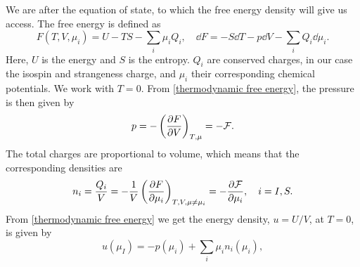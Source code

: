 We are after the equation of state, to which the free energy density will give us access.
The free energy is defined as
%
\begin{equation}
    \label{thermodynamic free energy}
    F(T, V, \mu_i) = U - TS - {\sum}_i \mu_i Q_i, 
    \quad \dd 
    F = - S \dd T - p \dd V - {\sum}_i Q_i \dd \mu_i.
\end{equation}
%
Here, $U$ is the energy and $S$ is the entropy.
$Q_i$ are conserved charges, in our case the isospin and strangeness charge, and $\mu_i$ their corresponding chemical potentials.
We work with $T = 0$.
From \autoref{thermodynamic free energy}, the pressure is then given by
%
\begin{equation}
    \label{pressure form free energy}
    p = - \left(\pdv{F}{V}\right)_{T, \mu} = - \mathcal{F}.
\end{equation}
%
The total charges are proportional to volume, which means that the corresponding densities are
%
\begin{equation}
    n_i = \frac{Q_i}{V} = - \frac{1}{V} \left(\pdv{F}{\mu_i}\right)_{T, V,\mu\neq\mu_i}
    = - \pdv{\mathcal{F}}{\mu_i}, \quad i = I, S.
\end{equation}
%
From \autoref{thermodynamic free energy} we get the energy density, $u = U/V$, at $T = 0$, is given by
%
\begin{equation}
    \label{energy density form pressure and isospin}
    u(\mu_I) = -p(\mu_i) + {\sum }_i\mu_i n_i(\mu_i),
\end{equation}


